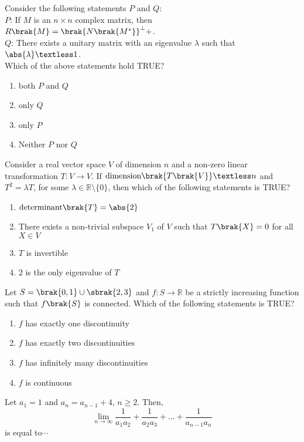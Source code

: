     \item Consider the following statements $P$ and $Q$:\\
       
         $P$: If $M$ is an $n \times n$ complex matrix, then $R\brak{M} = \brak{N\brak{M^*}}^\perp+$.\\
        $Q$: There exists a unitary matrix with an eigenvalue $\lambda$ such that $\abs{\lambda} \textless 1$.\\
    Which of the above statements hold TRUE?
    \begin{enumerate}
        \item both $P$ and $Q$
        \item only $Q$
        \item only $P$
        \item Neither $P$ nor $Q$
    \end{enumerate}

    \item Consider a real vector space $V$ of dimension $n$ and a non-zero linear transformation $T: V \to V$. If $\text{dimension}\brak{T\brak{V}} \textless n$ and $T^2 = \lambda T$, for some $\lambda \in \mathbb{R} \setminus \{0\}$, then which of the following statements is TRUE?
    \begin{enumerate}
        \item $\text{determinant}\brak{T} = \abs{2}$
        \item There exists a non-trivial subspace $V_1$ of $V$ such that $T\brak{X} = 0$ for all $X \in V$
        \item $T$ is invertible
        \item $2$ is the only eigenvalue of $T$
    \end{enumerate}

    \item Let $S = \brak{0,1} \cup \sbrak{2,3}$ and $f: S \to \mathbb{R}$ be a strictly increasing function such that $f\brak{S}$ is connected. Which of the following statements is TRUE?
    \begin{enumerate}
        \item $f$ has exactly one discontinuity
        \item $f$ has exactly two discontinuities
        \item $f$ has infinitely many discontinuities
        \item $f$ is continuous
    \end{enumerate}

    \item Let $a_1 = 1$ and $a_n = a_{n-1} + 4$, $n \geq 2$. Then,
    $$\lim_{n \to \infty} \frac{1}{a_1 a_2} + \frac{1}{a_2 a_3} + \dots + \frac{1}{a_{n-1} a_n}$$
    is equal to$\cdots$

